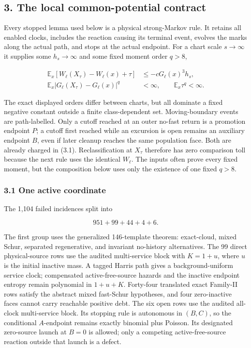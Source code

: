 \subsection{3. The local common-potential
contract}

Every stopped lemma used below is a physical strong-Markov rule. It
retains all enabled clocks, includes the reaction causing its terminal
event, evolves the marks along the actual path, and stops at the actual
endpoint. For a chart scale \(s\to\infty\) it supplies some
\(h_s\to\infty\) and some fixed moment order \(q>8\),

\[
 \begin{aligned}
 \mathbb E_x[W_\ell(X_\tau)-W_\ell(x)+\tau]
    &\le-cG_\ell(x)^3h_s,\\
 \mathbb E_x|G_\ell(X_\tau)-G_\ell(x)|^q
    &<\infty,\qquad
 \mathbb E_x\tau^q<\infty .
 \end{aligned}                                                \tag{3.1}
\]

The exact displayed orders differ between charts, but all dominate a
fixed negative constant outside a finite class-dependent set.
Moving-boundary events are path-labelled. Only a cutoff reached at an
outer no-fast return is a promotion endpoint \(P\); a cutoff first
reached while an excursion is open remains an auxiliary endpoint \(B\),
even if later cleanup reaches the same population face. Both are already
charged in (3.1). Reclassification at \(X_\tau\) therefore has zero
comparison toll because the next rule uses the identical \(W_\ell\). The
inputs often prove every fixed moment, but the composition below uses
only the existence of one fixed \(q>8\).

\subsubsection{3.1 One active coordinate}

The 1,104 failed incidences split into

\[
 951+99+44+4+6.                                      \tag{3.2}
\]

The first group uses the generalized 146-template theorem: exact-cloud,
mixed Schur, separated regenerative, and invariant no-history
alternatives. The 99 direct physical-source rows use the audited
multi-service block with \(K=1+u\), where \(u\) is the initial inactive
mass. A tagged Harris path gives a background-uniform service clock;
compensated active-free-source hazards and the inactive endpoint entropy
remain polynomial in \(1+u+K\). Forty-four translated exact Family-II
rows satisfy the abstract mixed fast-Schur hypotheses, and four
zero-inactive faces cannot carry reachable positive debt. The six open
rows use the audited all-clock multi-service block. Its stopping rule is
autonomous in \((B,C)\), so the conditional \(A\)-endpoint remains
exactly binomial plus Poisson. Its designated zero-source launch at
\(B=0\) is allowed; only a competing active-free-source reaction outside
that launch is a defect.

